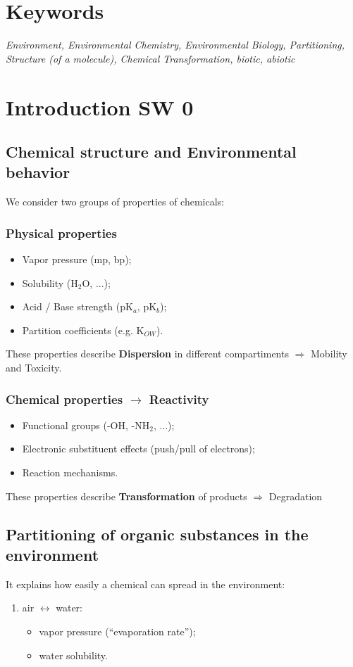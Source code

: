 \documentclass{article}
\begin{document}
\section{Keywords}
{\itshape Environment, Environmental Chemistry, Environmental Biology, Partitioning, Structure (of a molecule),
Chemical Transformation, biotic, abiotic}

\section{Introduction SW 0}
\subsection{Chemical structure and Environmental behavior}
We consider two groups of properties of chemicals:
\subsubsection{Physical properties}
\begin{itemize}
    \item Vapor pressure (mp, bp);
    \item Solubility (H$_2$O, ...);
    \item Acid / Base strength (pK$_a$, pK$_b$);
    \item Partition coefficients (e.g. K$_{OW}$).
\end{itemize}

These properties describe \textbf{Dispersion} in different compartiments $\Rightarrow$ Mobility and Toxicity.

\subsubsection{Chemical properties $\rightarrow$ Reactivity}
\begin{itemize}
    \item Functional groups (-OH, -NH$_2$, ...);
    \item Electronic substituent effects (push/pull of electrons);
    \item Reaction mechanisms.
\end{itemize}

These properties describe \textbf{Transformation} of products $\Rightarrow$ Degradation

\subsection{Partitioning of organic substances in the environment}
It explains how easily a chemical can spread in the environment:
\begin{enumerate}
    \item air $\leftrightarrow$ water:
        \begin{itemize}
            \item vapor pressure (``evaporation rate'');
            \item water solubility.
        \end{itemize}
\end{enumerate}
\end{document}
